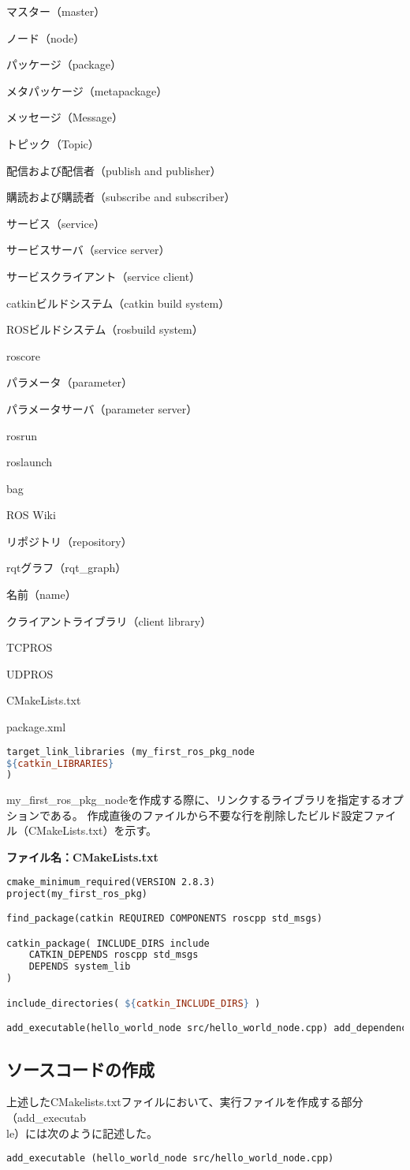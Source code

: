 \begin{term}{マスター（master）}
\begin{term}{ノード（node）}
\begin{term}{パッケージ（package）}
\begin{term}{メタパッケージ（metapackage）}
\begin{term}{メッセージ（Message）}
\begin{term}{トピック（Topic）}
\begin{term}{配信および配信者（publish and publisher）}
\begin{term}{購読および購読者（subscribe and subscriber）}
\begin{term}{サービス（service）}
\begin{term}{サービスサーバ（service server）}
\begin{term}{サービスクライアント（service client）}
\begin{term}{catkinビルドシステム（catkin build system）}
\begin{term}{ROSビルドシステム（rosbuild system）}
\begin{term}{roscore}
\begin{term}{パラメータ（parameter）}
\begin{term}{パラメータサーバ（parameter server）}
\begin{term}{rosrun}
\begin{term}{roslaunch}
\begin{term}{bag}
\begin{term}{ROS Wiki}
\begin{term}{リポジトリ（repository）}
\begin{term}{rqtグラフ（rqt\_graph）}
\begin{term}{名前（name）}
\begin{term}{クライアントライブラリ（client library）}
\begin{term}{TCPROS}
\begin{term}{UDPROS}
\begin{term}{CMakeLists.txt}
\begin{term}{package.xml}
\begin{lstlisting}[language=make]
target_link_libraries (my_first_ros_pkg_node
${catkin_LIBRARIES}
)
\end{lstlisting}

my\_first\_ros\_pkg\_nodeを作成する際に、リンクするライブラリを指定するオプションである。
作成直後のファイルから不要な行を削除したビルド設定ファイル（CMakeLists.txt）を示す。

\noindent\textbf{ファイル名：CMakeLists.txt}
\begin{lstlisting}[language=make]
cmake_minimum_required(VERSION 2.8.3)
project(my_first_ros_pkg)

find_package(catkin REQUIRED COMPONENTS roscpp std_msgs)

catkin_package( INCLUDE_DIRS include
    CATKIN_DEPENDS roscpp std_msgs
    DEPENDS system_lib
)

include_directories( ${catkin_INCLUDE_DIRS} )

add_executable(hello_world_node src/hello_world_node.cpp) add_dependencies(hello_world_node my_first_ros_pkg_generate_messages_cpp) target_link_libraries(hello_world_node ${catkin_LIBRARIES})
\end{lstlisting}

\subsection{ソースコードの作成}
上述したCMakelists.txtファイルにおいて、実行ファイルを作成する部分（add\_executab\\le）には次のように記述した。

\begin{lstlisting}[language=ROS]
add_executable (hello_world_node src/hello_world_node.cpp)
\end{lstlisting}


\end{term}
\end{term}
\end{term}
\end{term}
\end{term}
\end{term}
\end{term}
\end{term}
\end{term}
\end{term}
\end{term}
\end{term}
\end{term}
\end{term}
\end{term}
\end{term}
\end{term}
\end{term}
\end{term}
\end{term}
\end{term}
\end{term}
\end{term}
\end{term}
\end{term}
\end{term}
\end{term}
\end{term}
